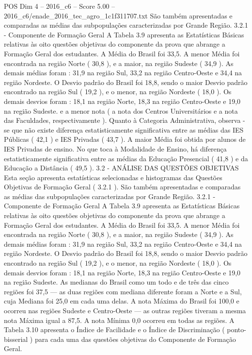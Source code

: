 \begin{textsample}{POS Dim 4 – 2016\_c6 – Score 5.00 – 2016\_c6/enade\_2016\_tec\_agro\_1c1f311707.txt}
São também apresentadas e comparadas as médias das subpopulações caracterizadas por Grande Região. 3.2.1 - Componente de Formação Geral A Tabela 3.9 apresenta as Estatísticas Básicas relativas às oito questões objetivas do componente da prova que abrange a Formação Geral dos estudantes.
A Média do Brasil foi 33,5.
A menor Média foi encontrada na região Norte ( 30,8 ), e a maior, na região Sudeste ( 34,9 ).
As demais médias foram : 31,9 na região Sul, 33,2 na região Centro-Oeste e 34,4 na região Nordeste.
O Desvio padrão do Brasil foi 18,8, sendo o maior Desvio padrão encontrado na região Sul ( 19,2 ), e o menor, na região Nordeste ( 18,0 ).
Os demais desvios foram : 18,1 na região Norte, 18,3 na região Centro-Oeste e 19,0 na região Sudeste. e a menor nota ( a nota dos Centros Universitários e a nota das Faculdades, respectivamente ).
Quanto à Categoria Administrativa, observa -se que não existe diferença estatisticamente significativa entre as médias das IES Públicas ( 42,1 ) e IES Privadas ( 43,7 ).
A maior Média foi obtida por alunos de IES Privadas de ensino.
No que toca à Modalidade de Ensino, há diferença estatisticamente significativa entre as médias da Educação Presencial ( 41,8 ) e da Educação a Distância ( 49,5 ). 3.2 - ANÁLISE DAS QUESTÕES OBJETIVAS Esta seção apresenta estatísticas selecionadas e histogramas das Questões Objetivas de Formação Geral ( 3.2.1 ).
São também apresentadas e comparadas as médias das subpopulações caracterizadas por Grande Região. 3.2.1 - Componente de Formação Geral A Tabela 3.9 apresenta as Estatísticas Básicas relativas às oito questões objetivas do componente da prova que abrange a Formação Geral dos estudantes.
A Média do Brasil foi 33,5.
A menor Média foi encontrada na região Norte ( 30,8 ), e a maior, na região Sudeste ( 34,9 ).
As demais médias foram : 31,9 na região Sul, 33,2 na região Centro-Oeste e 34,4 na região Nordeste.
O Desvio padrão do Brasil foi 18,8, sendo o maior Desvio padrão encontrado na região Sul ( 19,2 ), e o menor, na região Nordeste ( 18,0 ).
Os demais desvios foram : 18,1 na região Norte, 18,3 na região Centro-Oeste e 19,0 na região Sudeste.
As medianas do Brasil como um todo e de três das cinco regiões foi 37,5 — as duas regiões com mediana diferente foram a Norte e a Sul, cuja Mediana foi 25,0 em cada uma delas.
A nota Máxima do Brasil foi 100,0 e ocorreu nas regiões Sudeste e Centro-Oeste — as outras regiões tiveram a mesma nota Máxima igual a 87,5.
A nota Mínima 0,0 ocorreu em todas as regiões.
A Tabela 3.10 apresenta o Índice de Facilidade e o Índice de Discriminação ( ponto-bisserial ) para cada uma das questões objetivas do Componente de Formação Geral.

\end{textsample}
